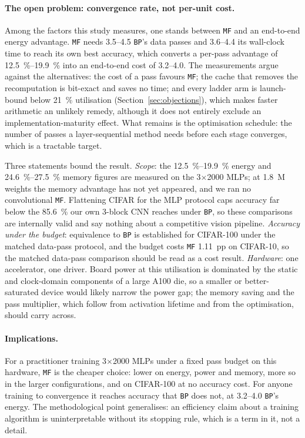 \documentclass{llncs}
\newcommand{\MF}{\texttt{MF}}
\newcommand{\BP}{\texttt{BP}}
\begin{document}
\paragraph{The open problem: convergence rate, not per-unit cost.}
\label{sec:limits}
Among the factors this study measures, one stands between \MF{} and an
end-to-end energy advantage. \MF{} needs \SIrange{3.5}{4.5}{\times} \BP{}'s data passes
and \SIrange{3.6}{4.4}{\times} its wall-clock time to reach its own best
accuracy, which converts a per-pass advantage of \SIrange{12.5}{19.9}{\percent}
into an end-to-end cost of \SIrange{3.2}{4.0}{\times}. The measurements
argue against the alternatives: the cost of a pass favours \MF{}; the cache
that removes the recomputation is bit-exact and saves no time; and every
ladder arm is launch-bound below \SI{21}{\percent} utilisation
(Section~\ref{sec:objections}), which makes faster arithmetic an unlikely
remedy, although it does not entirely exclude an implementation-maturity
effect. What remains is the optimisation schedule: the number of passes a
layer-sequential method needs before each stage converges, which is a
tractable target.

Three statements bound the result. \emph{Scope}: the
\SIrange{12.5}{19.9}{\percent} energy and \SIrange{24.6}{27.5}{\percent} memory figures
are measured on the \num{3}$\times$\num{2000} MLPs; at \num{1.8}~M weights the
memory advantage has not yet appeared, and we ran no convolutional \MF{}.
Flattening CIFAR for the MLP protocol caps accuracy far below the
\SI{85.6}{\percent} our own \num{3}-block CNN reaches under \BP{}, so these
comparisons are internally valid and say nothing about a competitive vision
pipeline.
\emph{Accuracy under the budget}: equivalence to \BP{} is established for CIFAR-100 under
the matched data-pass protocol, and the budget costs \MF{} \num{1.11}~pp on CIFAR-10,
so the matched data-pass comparison should be read as a cost result.
\emph{Hardware}: one accelerator, one driver. Board power at
this utilisation is dominated by the static and clock-domain components of a
large A100 die, so a smaller or better-saturated device would likely narrow the
power gap; the memory saving and the pass multiplier, which follow from
activation lifetime and from the optimisation, should carry across.

\paragraph{Implications.}
For a practitioner training \num{3}$\times$\num{2000} MLPs under a fixed
pass budget on this hardware, \MF{} is the cheaper choice: lower on
energy, power and memory, more so in the larger configurations, and on CIFAR-100 at no
accuracy cost. For anyone
training to convergence it reaches accuracy that \BP{} does not, at
\SIrange{3.2}{4.0}{\times} \BP{}'s energy. The methodological
point generalises: an efficiency claim about a training algorithm is
uninterpretable without its stopping rule, which is a term in it, not a
detail.
\end{document}
